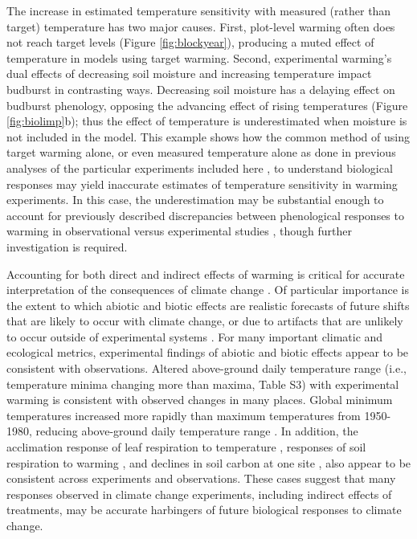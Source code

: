 \documentclass{article}
\begin{document}
\par The increase in estimated temperature sensitivity with measured (rather than target) temperature has two major causes. First, plot-level warming often does not reach target levels (Figure \ref{fig:blockyear}), producing a muted effect of temperature in models using target warming. Second, experimental warming's dual effects of decreasing soil moisture and increasing temperature impact budburst in contrasting ways. 
Decreasing soil moisture has a delaying effect on budburst phenology, opposing the advancing effect of rising temperatures (Figure \ref{fig:biolimp}b); thus the effect of temperature is underestimated when moisture is not included in the model. This example shows how the common method of using target warming alone, or even measured temperature alone as done in previous analyses of the particular experiments included here \citep[exp01, exp03, exp04, exp10,][]{clark2014a,clark2014b,polgar2014,marchin2015}, to understand biological responses may yield inaccurate estimates of temperature sensitivity in warming experiments. In this case, the underestimation may be substantial enough to account for previously described discrepancies between phenological responses to warming in observational versus experimental studies \citep{wolkovich2012,polgar2014}, though further investigation is required. 

\par Accounting for both direct and indirect effects of warming is critical for accurate interpretation of the consequences of climate change \citep{kharouba2015}. Of particular importance is the extent to which abiotic and biotic effects are realistic forecasts of future shifts that are likely to occur with climate change, or due to artifacts that are unlikely to occur outside of experimental systems \citep{hurlbert1984,moise2010,diamond2013}. For many important climatic and ecological metrics, experimental findings of abiotic and biotic effects appear to be consistent with observations. Altered above-ground daily temperature range (i.e., temperature minima changing more than maxima, Table S3) with experimental warming is consistent with observed changes in many places. Global minimum temperatures increased more rapidly than maximum temperatures from 1950-1980, reducing above-ground daily temperature range \citep[][]{thorne2016,vose2005}. In addition, the acclimation response of leaf respiration to temperature \citep{aspinwall2016,reich2016}, responses of soil respiration to warming \citep{carey2016}, and declines in soil carbon at one site \citep{harte2015}, also appear to be consistent across experiments and observations. These cases suggest that many responses observed in climate change experiments, including indirect effects of treatments, may be accurate harbingers of future biological responses to climate change. 
\end{document}
